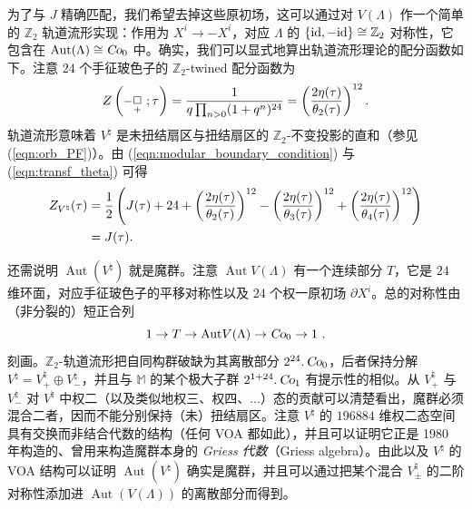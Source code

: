 \documentclass[11pt,a4paper,fontset=windows]{ctexart}
\numberwithin{equation}{section}
\newcommand{\SL}{\operatorname{\textsl{SL}}}      %
\newcommand{\Co}{\operatorname{\textsl{Co}}}      %
\newcommand{\Aut}{\operatorname{\text{Aut}}}      %
\newcommand{\ZZ}{\mathbb{Z}}
\newcommand{\MM}{\mathbb{M}}
\def\pa{\partial}
\def\t{\tau}
\def\L{\Lambda}
\newcommand{\be}{\begin{equation}}
\newcommand{\ee}{\end{equation}}
\newcommand{\eq}[1]{(\ref{#1})}
\begin{document}

为了与 $J$ 精确匹配，我们希望去掉这些原初场，这可以通过对 $V(\Lambda)$ 作一个简单的 $\ZZ_2$ 轨道流形实现：作用为 $X^i\rightarrow-X^i$，对应 $\Lambda$ 的 $\lbrace{\rm id},-{\rm id}\rbrace\cong\ZZ_2$ 对称性，它包含在 $\Aut(\L)\cong\Co_0$ 中。确实，我们可以显式地算出轨道流形理论的配分函数如下。注意 $24$ 个手征玻色子的 $\ZZ_2$-twined 配分函数为
\be
Z\left(\mbox{\fontsize{9}{10}\selectfont $-$}\underset{+}{\Box}~;\t\right)= {1\over q\prod_{n>0}(1+q^{n})^{24}} = \left(2 \eta(\t)\over \theta_2(\t) \right)^{12}. 
\ee
轨道流形意味着 $V^\natural$ 是未扭结扇区与扭结扇区的 $\ZZ_2$-不变投影的直和（参见 \eq{eqn:orb_PF}）。由 \eq{eqn:modular_boundary_condition} 与 \eq{eqn:transf_theta} 可得
\begin{gather}
\begin{split}
Z_{V^\natural}(\tau)& ={1\over 2}\left( J(\t)+24 + \left(2 \eta(\t)\over \theta_2(\t) \right)^{12} -  \left(2 \eta(\t)\over \theta_3(\t) \right)^{12} +\left(2 \eta(\t)\over \theta_4(\t) \right)^{12} \right) \\& = J(\t). 
\end{split}
\end{gather}


还需说明 $\Aut(V^\natural)$ 就是魔群。注意 $\Aut V(\Lambda)$ 有一个连续部分 $T$，它是 $24$ 维环面，对应手征玻色子的平移对称性以及 $24$ 个权一原初场 $\pa X^i$。总的对称性由（非分裂的）短正合列
\be
1 \rightarrow T \rightarrow {\rm Aut}V(\Lambda) \rightarrow \Co_0 \rightarrow 1~. 
\ee 
刻画。$\ZZ_2$-轨道流形把自同构群破缺为其离散部分 $2^{24}.\Co_0$，后者保持分解 $V^\natural=V^\natural_+\oplus V^\natural_-$，并且与 $\MM$ 的某个极大子群 $2^{1+24}.\Co_1$ 有提示性的相似。从 $V^\natural_+$ 与 $V^\natural_-$ 对 $V^\natural$ 中权二（以及类似地权三、权四、$\dots$）态的贡献可以清楚看出，魔群必须混合二者，因而不能分别保持（未）扭结扇区。注意 $V^\natural$ 的 $196884$ 维权二态空间具有交换而非结合代数的结构（任何 VOA 都如此），并且可以证明它正是 1980 年构造的、曾用来构造魔群本身的 \emph{Griess 代数}（Griess algebra）\cite{Gri_FG}。由此以及 $V^\natural$ 的 VOA 结构可以证明 $\Aut(V^\natural)$ 确实是魔群，并且可以通过把某个混合 $V^\natural_\pm$ 的二阶对称性添加进 $\Aut(V(\Lambda))$ 的离散部分而得到。
\end{document}
